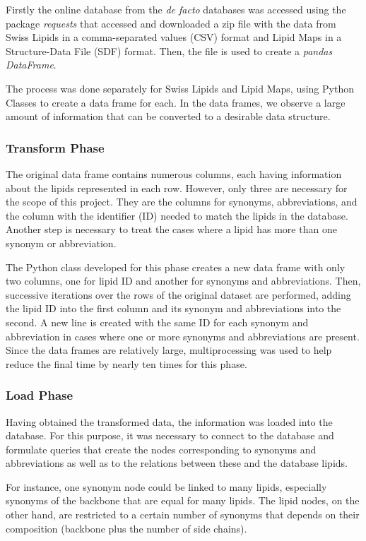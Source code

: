 \documentclass{llncs}
\begin{document}
Firstly the online database from the \textit{de facto} databases was accessed using the package \textit{requests} that accessed and downloaded a zip file with the data from Swiss Lipids in a comma-separated values (CSV) format and Lipid Maps in a Structure-Data File (SDF) format. Then, the file is used to create a \textit{pandas DataFrame}. 

The process was done separately for Swiss Lipids and Lipid Maps, using Python Classes to create a data frame for each. 
In the data frames, we observe a large amount of information that can be converted to a desirable data structure.

\subsubsection{Transform Phase}

The original data frame contains numerous columns, each having information about the lipids represented in each row. However, only three are necessary for the scope of this project.
They are the columns for synonyms, abbreviations, and the column with the identifier (ID) needed to match the lipids in the database. 
Another step is necessary to treat the cases where a lipid has more than one synonym or abbreviation.

The Python class developed for this phase creates a new data frame with only two columns, one for lipid ID and another for synonyms and abbreviations.
Then, successive iterations over the rows of the original dataset are performed, adding the lipid ID into the first column and its synonym and abbreviations into the second. 
A new line is created with the same ID for each synonym and abbreviation in cases where one or more synonyms and abbreviations are present.
Since the data frames are relatively large, multiprocessing was used to help reduce the final time by nearly ten times for this phase.

\subsubsection{Load Phase}
Having obtained the transformed data, the information was loaded into the database. For this purpose, it was necessary to connect to the database and formulate queries that create the nodes corresponding 
to synonyms and abbreviations as well as to the relations between these and the database lipids.

For instance, one synonym node could be linked to many lipids, especially synonyms of the backbone that are equal for many lipids. 
The lipid nodes, on the other hand, are restricted to a certain number of synonyms that depends on their composition (backbone plus the number of side chains).
\end{document}
